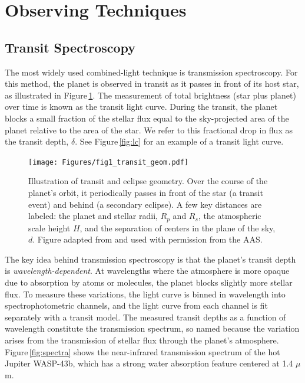 \documentclass[graybox,natbib,nosecnum]{svmult}
\begin{document}

\section{Observing Techniques} 

\subsection{Transit Spectroscopy}
The most widely used combined-light technique is transmission spectroscopy. For this method, the planet is observed in transit as it passes in front of its host star, as illustrated in Figure\,\ref{fig:geom}.  The measurement of total brightness (star plus planet) over time is known as the transit light curve.  During the transit, the planet blocks a small fraction of the stellar flux equal to the sky-projected area of the planet relative to the area of the star. We refer to this fractional drop in flux as the transit depth, $\delta$. See Figure\,\ref{fig:lc} for an example of a transit light curve.

\begin{figure}
\begin{centering}
\texttt{[image: Figures/fig1\_transit\_geom.pdf]}
\caption{Illustration of transit and eclipse geometry. Over the course of the planet's orbit, it periodically passes in front of the star (a transit event) and behind (a secondary eclipse). A few key distances are labeled: the planet and stellar radii, $R_p$ and $R_s$, the atmospheric scale height $H$, and the separation of centers in the plane of the sky, $d$. Figure adapted from \citealt{robinson17} and used with permission from the AAS.}
\label{fig:geom}       
\end{centering}
\end{figure}

The key idea behind transmission spectroscopy is that the planet's transit depth is \emph{wavelength-dependent}.  At wavelengths where the atmosphere is more opaque due to absorption by atoms or molecules, the planet blocks slightly more stellar flux.  To measure these variations, the light curve is binned in wavelength into spectrophotometric channels, and the light curve from each channel is fit separately with a transit model.  The measured transit depths as a function of wavelength constitute the transmission spectrum, so named because the variation arises from the transmission of stellar flux through the planet's atmosphere. Figure\,\ref{fig:spectra} shows the near-infrared transmission spectrum of the hot Jupiter WASP-43b, which has a strong water absorption feature centered at 1.4 $\mu$m. 
 
\end{document}
